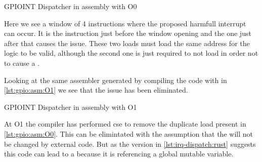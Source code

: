\begin{listing}[H]
  \caption{GPIOINT Dispatcher in assembly with O0}
  \label{lst:gpio:asm:O0}
\end{listing}

Here we see a window of 4 instructions where the proposed harmfull interrupt can occur.
It is the  instruction just before the window opening and the one just after that causes the issue.
These two loads must load the same address for the logic to be valid, although the second one is just required to not load  in order not to cause a .

Looking at the same assembler generated by compiling the code with  in \autoref{lst:gpio:asm:O1} we see that the issue has been eliminated.

\begin{listing}[H]
  \caption{GPIOINT Dispatcher in assembly with O1}
  \label{lst:gpio:asm:O1}
\end{listing}

At O1 the compiler has performed \gls{cse} to remove the duplicate load present in \autoref{lst:gpio:asm:O0}.
This can be elimintated with the assumption that the  will not be changed by external code.
But as the {\rust} version in \autoref{lst:irq-dispatch:rust} suggests this code can lead to a  because it is referencing a global mutable variable.

